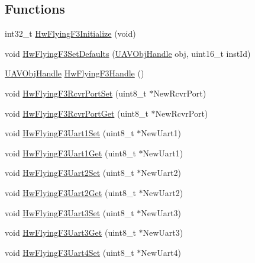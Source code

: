 \subsection*{\-Functions}
\begin{DoxyCompactItemize}
\item 
int32\-\_\-t \hyperlink{group___hw_flying_f3_gae66f12f5714ae28a7cd713f9b4ee2046}{\-Hw\-Flying\-F3\-Initialize} (void)
\item 
void \hyperlink{group___hw_flying_f3_ga9402980504d2f14f542cbc70f42d253e}{\-Hw\-Flying\-F3\-Set\-Defaults} (\hyperlink{targets_2_u_a_v_objects_2inc_2uavobjectmanager_8h_a279053e22be53ce9f895043aaeb91e3b}{\-U\-A\-V\-Obj\-Handle} obj, uint16\-\_\-t inst\-Id)
\item 
\hyperlink{targets_2_u_a_v_objects_2inc_2uavobjectmanager_8h_a279053e22be53ce9f895043aaeb91e3b}{\-U\-A\-V\-Obj\-Handle} \hyperlink{group___hw_flying_f3_ga100c9f5c1d90a9e83014cbb5d13f0c1c}{\-Hw\-Flying\-F3\-Handle} ()
\item 
void \hyperlink{group___hw_flying_f3_ga47b6537f947d767e37242272487c3b38}{\-Hw\-Flying\-F3\-Rcvr\-Port\-Set} (uint8\-\_\-t $\ast$\-New\-Rcvr\-Port)
\item 
void \hyperlink{group___hw_flying_f3_ga497ee338e10080def505a0fea3fcf287}{\-Hw\-Flying\-F3\-Rcvr\-Port\-Get} (uint8\-\_\-t $\ast$\-New\-Rcvr\-Port)
\item 
void \hyperlink{group___hw_flying_f3_gabf417956e16920ddbb7f8d04229c81a5}{\-Hw\-Flying\-F3\-Uart1\-Set} (uint8\-\_\-t $\ast$\-New\-Uart1)
\item 
void \hyperlink{group___hw_flying_f3_gaa36d5b7db690ce44349082e2192c5516}{\-Hw\-Flying\-F3\-Uart1\-Get} (uint8\-\_\-t $\ast$\-New\-Uart1)
\item 
void \hyperlink{group___hw_flying_f3_ga18f5f3dc46a28b2fc6703c90e2047108}{\-Hw\-Flying\-F3\-Uart2\-Set} (uint8\-\_\-t $\ast$\-New\-Uart2)
\item 
void \hyperlink{group___hw_flying_f3_gafb544f61199e77c32a7002ce69cb5979}{\-Hw\-Flying\-F3\-Uart2\-Get} (uint8\-\_\-t $\ast$\-New\-Uart2)
\item 
void \hyperlink{group___hw_flying_f3_ga81b6f20d33f70b30fa9c7b1003455b78}{\-Hw\-Flying\-F3\-Uart3\-Set} (uint8\-\_\-t $\ast$\-New\-Uart3)
\item 
void \hyperlink{group___hw_flying_f3_ga30bc4cdf3e57cd4398c91514e0d97704}{\-Hw\-Flying\-F3\-Uart3\-Get} (uint8\-\_\-t $\ast$\-New\-Uart3)
\item 
void \hyperlink{group___hw_flying_f3_ga7d70678fb2ace58d134e5e978e17660e}{\-Hw\-Flying\-F3\-Uart4\-Set} (uint8\-\_\-t $\ast$\-New\-Uart4)

\end{DoxyCompactItemize}
